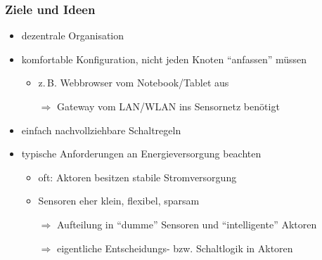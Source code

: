 \documentclass{beamer}
\newcommand{\customitemsep}{7pt}
\newcommand{\customitemsepsub}{2pt}
\begin{document}
\begin{frame}
\begin{columns}[c]
    \end{columns}
\end{frame}

\begin{frame}
    \frametitle{Ziele und Ideen}

		    \begin{itemize} \setlength{\itemsep}{\customitemsep}
		        \item dezentrale Organisation
		        \item komfortable Konfiguration, nicht jeden Knoten \enquote{anfassen} müssen
		            \begin{itemize} \setlength{\itemsep}{\customitemsepsub}
		                \item z.\,B. Webbrowser vom Notebook/Tablet aus
		                \item[$\Rightarrow$] Gateway vom LAN/WLAN ins Sensornetz benötigt
		            \end{itemize}
		        
		        \pause
		        \item einfach nachvollziehbare Schaltregeln
		        \item typische Anforderungen an Energieversorgung beachten
		            \begin{itemize} \setlength{\itemsep}{\customitemsepsub}
		                \item oft: Aktoren besitzen stabile Stromversorgung
		                \item Sensoren eher klein, flexibel, sparsam
		                \item[$\Rightarrow$] Aufteilung in \enquote{dumme} Sensoren und \enquote{intelligente} Aktoren
		                \item[$\Rightarrow$] eigentliche Entscheidungs- bzw. Schaltlogik in Aktoren
		            \end{itemize}
		            
		    \end{itemize}
\end{frame}
\end{document}
